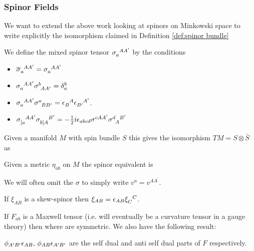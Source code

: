 \documentclass{article}
\begin{document}
\subsubsection{Spinor Fields}
We want to extend the above work looking at spinors on Minkowski space to write explicitly the isomorphism claimed in Definition \ref{def:spinor bundle}
\begin{definition}
	We define the mixed spinor tensor $\sigma\indices{_a^A^{A^\prime}}$ by the conditions
	\begin{itemize}
		\item $\bar{\sigma}\indices{_a^A^{A^\prime}} = \sigma\indices{_a^A^{A^\prime}}$
		\item $\sigma\indices{_a^A^{A^\prime}} \sigma\indices{^b_A_{A^\prime}} = \delta^b_a$
		\item $\sigma\indices{_a^A^{A^\prime}} \sigma\indices{^a_B_{B^\prime}} = \eps\indices{_B^A}\eps\indices{_{B^\prime}^{A^\prime}}$.
		\item $\sigma\indices{_[_a^A^{A^\prime}}\sigma\indices{_b_]_A^{B^\prime}} = -\frac{1}{2}i \eps_{abcd} \sigma^{cAA^\prime} \sigma\indices{^d_A^{B^\prime}}$
	\end{itemize}
Given a manifold $M$ with spin bundle $S$ this gives the isomorphism $TM = S \otimes \bar{S}$ as 
\end{definition}

\begin{lemma}
	Given a metric $\eta_{ab}$ on $M$ the spinor equivalent is 
\end{lemma}

\begin{remark}
	We will often omit the $\sigma$ to simply write $v^a = v^{AA^\prime}$. 
\end{remark}

\begin{lemma}
	If $\xi_{AB}$ is a skew-spinor then $\xi_{AB} = \eps_{AB} \xi\indices{_C^C}$. 
\end{lemma}

\begin{example}
	If $F_{ab}$ is a Maxwell tensor (i.e. will eventually be a curvature tensor in a gauge theory) then 
where 
are symmetric. We also have the following result:
\begin{lemma}
	$\phi_{A^\prime B^\prime}\epsilon_{AB}, \, \phi_{AB}\epsilon_{A^\prime B^\prime}$ are the self dual and anti self dual parts of $F$ respectively. 
\end{lemma}
\end{example}
\end{document}
